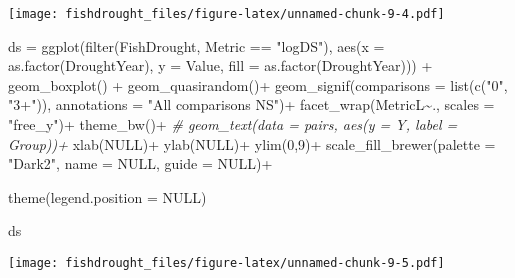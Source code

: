 \documentclass[
]{article}
\newenvironment{Shaded}{\begin{snugshade}}{\end{snugshade}}
\newcommand{\AttributeTok}[1]{\textcolor[rgb]{0.77,0.63,0.00}{#1}}
\newcommand{\CommentTok}[1]{\textcolor[rgb]{0.56,0.35,0.01}{\textit{#1}}}
\newcommand{\ConstantTok}[1]{\textcolor[rgb]{0.00,0.00,0.00}{#1}}
\newcommand{\DecValTok}[1]{\textcolor[rgb]{0.00,0.00,0.81}{#1}}
\newcommand{\FunctionTok}[1]{\textcolor[rgb]{0.00,0.00,0.00}{#1}}
\newcommand{\NormalTok}[1]{#1}
\newcommand{\OtherTok}[1]{\textcolor[rgb]{0.56,0.35,0.01}{#1}}
\newcommand{\SpecialCharTok}[1]{\textcolor[rgb]{0.00,0.00,0.00}{#1}}
\newcommand{\StringTok}[1]{\textcolor[rgb]{0.31,0.60,0.02}{#1}}
\begin{document}
\texttt{[image: fishdrought\_files/figure-latex/unnamed-chunk-9-4.pdf]}

\begin{Shaded}
\begin{Highlighting}[]
\NormalTok{ds }\OtherTok{=} \FunctionTok{ggplot}\NormalTok{(}\FunctionTok{filter}\NormalTok{(FishDrought, Metric }\SpecialCharTok{==} \StringTok{"logDS"}\NormalTok{),  }\FunctionTok{aes}\NormalTok{(}\AttributeTok{x =} \FunctionTok{as.factor}\NormalTok{(DroughtYear), }\AttributeTok{y =}\NormalTok{ Value, }\AttributeTok{fill =} \FunctionTok{as.factor}\NormalTok{(DroughtYear))) }\SpecialCharTok{+} 
  \FunctionTok{geom\_boxplot}\NormalTok{() }\SpecialCharTok{+}
  \FunctionTok{geom\_quasirandom}\NormalTok{()}\SpecialCharTok{+}
  \FunctionTok{geom\_signif}\NormalTok{(}\AttributeTok{comparisons =} \FunctionTok{list}\NormalTok{(}\FunctionTok{c}\NormalTok{(}\StringTok{"0"}\NormalTok{, }\StringTok{"3+"}\NormalTok{)), }\AttributeTok{annotations =} \StringTok{"All comparisons NS"}\NormalTok{)}\SpecialCharTok{+}
  \FunctionTok{facet\_wrap}\NormalTok{(MetricL}\SpecialCharTok{\textasciitilde{}}\NormalTok{., }\AttributeTok{scales =} \StringTok{"free\_y"}\NormalTok{)}\SpecialCharTok{+} \FunctionTok{theme\_bw}\NormalTok{()}\SpecialCharTok{+}
 \CommentTok{\# geom\_text(data = pairs, aes(y = Y, label = Group))+}
  \FunctionTok{xlab}\NormalTok{(}\ConstantTok{NULL}\NormalTok{)}\SpecialCharTok{+} \FunctionTok{ylab}\NormalTok{(}\ConstantTok{NULL}\NormalTok{)}\SpecialCharTok{+} \FunctionTok{ylim}\NormalTok{(}\DecValTok{0}\NormalTok{,}\DecValTok{9}\NormalTok{)}\SpecialCharTok{+}
  \FunctionTok{scale\_fill\_brewer}\NormalTok{(}\AttributeTok{palette =} \StringTok{"Dark2"}\NormalTok{, }\AttributeTok{name =} \ConstantTok{NULL}\NormalTok{, }\AttributeTok{guide =} \ConstantTok{NULL}\NormalTok{)}\SpecialCharTok{+}

  \FunctionTok{theme}\NormalTok{(}\AttributeTok{legend.position =} \ConstantTok{NULL}\NormalTok{)}

\NormalTok{  ds}
\end{Highlighting}
\end{Shaded}

\texttt{[image: fishdrought\_files/figure-latex/unnamed-chunk-9-5.pdf]}
\end{document}
